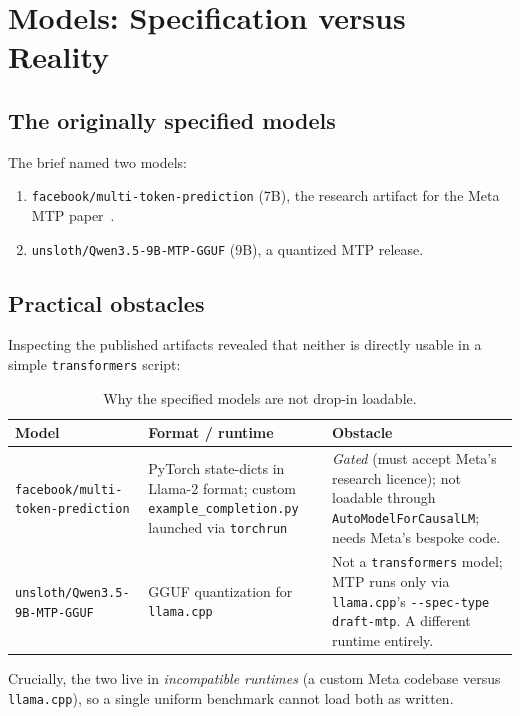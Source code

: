 \documentclass[11pt]{article}
\begin{document}
\section{Models: Specification versus Reality}
\subsection{The originally specified models}
The brief named two models:
\begin{enumerate}[nosep]
  \item \texttt{facebook/multi-token-prediction} (7B), the research artifact for
        the Meta MTP paper~\cite{gloeckle2024}.
  \item \texttt{unsloth/Qwen3.5-9B-MTP-GGUF} (9B), a quantized MTP release.
\end{enumerate}

\subsection{Practical obstacles}
Inspecting the published artifacts revealed that neither is directly usable in a
simple \texttt{transformers} script:

\begin{table}[h]
\centering
\caption{Why the specified models are not drop-in loadable.}
\begin{tabular}{@{}p{3.6cm}p{4.0cm}p{4.6cm}@{}}
\toprule
\textbf{Model} & \textbf{Format / runtime} & \textbf{Obstacle} \\
\midrule
\texttt{facebook/multi-token-prediction} &
PyTorch state-dicts in Llama-2 format; custom \texttt{example\_completion.py}
launched via \texttt{torchrun} &
\emph{Gated} (must accept Meta's research licence); not loadable through
\texttt{AutoModelForCausalLM}; needs Meta's bespoke code. \\
\addlinespace
\texttt{unsloth/Qwen3.5-9B-MTP-GGUF} &
GGUF quantization for \texttt{llama.cpp} &
Not a \texttt{transformers} model; MTP runs only via \texttt{llama.cpp}'s
\texttt{-{}-spec-type draft-mtp}. A different runtime entirely. \\
\bottomrule
\end{tabular}
\end{table}

Crucially, the two live in \emph{incompatible runtimes} (a custom Meta codebase
versus \texttt{llama.cpp}), so a single uniform benchmark cannot load both as
written.
\end{document}
